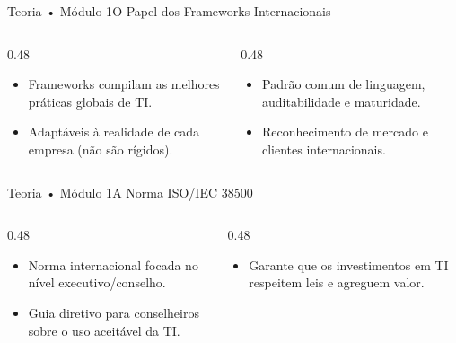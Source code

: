 \begin{senaiframe}{Teoria • Módulo 1}{O Papel dos Frameworks Internacionais}
  \begin{columns}[t]
    \begin{column}{0.48\textwidth}
      \begin{tcolorbox}[senaibluecard, title={Não Reinventar a Roda}]
        \begin{itemize}
          \item Frameworks compilam as melhores práticas globais de TI.
          \item Adaptáveis à realidade de cada empresa (não são rígidos).
        \end{itemize}
      \end{tcolorbox}
    \end{column}
    \begin{column}{0.48\textwidth}
      \begin{tcolorbox}[senaicard, title={Benefícios de Adoção}]
        \begin{itemize}
          \item Padrão comum de linguagem, auditabilidade e maturidade.
          \item Reconhecimento de mercado e clientes internacionais.
        \end{itemize}
      \end{tcolorbox}
    \end{column}
  \end{columns}
\end{senaiframe}

\begin{senaiframe}{Teoria • Módulo 1}{A Norma ISO/IEC 38500}
  \begin{columns}[t]
    \begin{column}{0.48\textwidth}
      \begin{tcolorbox}[senaibluecard, title={Escopo do Padrão}]
        \begin{itemize}
          \item Norma internacional focada no nível executivo/conselho.
          \item Guia diretivo para conselheiros sobre o uso aceitável da TI.
        \end{itemize}
      \end{tcolorbox}
    \end{column}
    \begin{column}{0.48\textwidth}
      \begin{tcolorbox}[senaigreencard, title={Orientação}]
        \begin{itemize}
          \item Garante que os investimentos em TI respeitem leis e agreguem valor.
        \end{itemize}
      \end{tcolorbox}
    \end{column}
  \end{columns}
\end{senaiframe}

